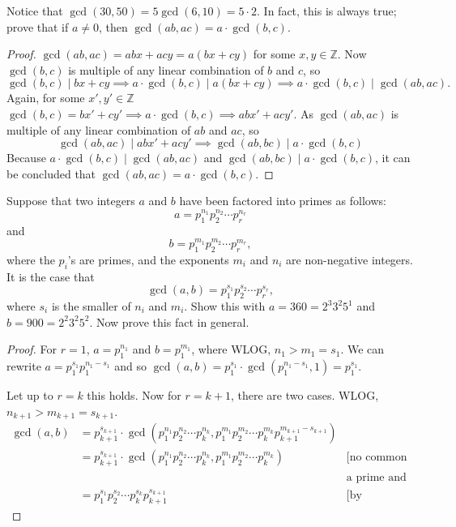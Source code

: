 \documentclass[12pt]{article}
\newenvironment{exercise}[2][Exercise]{\begin{trivlist}
\item[\hskip \labelsep {\bfseries #1}\hskip \labelsep {\bfseries #2.}]}{\end{trivlist}}
\begin{document}
\begin{exercise}{9}
    Notice that \(\gcd(30, 50) = 5 \gcd(6, 10) = 5 \cdot 2\). In fact, this is always true; prove that if \(a \neq 0\), then \(\gcd(ab, ac) = a \cdot \gcd(b, c)\).
\end{exercise}

\begin{proof}
    $\gcd(ab,ac)= abx+acy = a(bx+cy)$ for some $x, y\in \mathbb{Z}$. Now $\gcd(b,c)$ is multiple of any linear combination of $b$ and $c$, so
    $$
    \gcd(b,c) \mid bx + cy \implies a\cdot \gcd(b,c) \mid a(bx+cy) \implies a\cdot \gcd(b,c) \mid \gcd(ab,ac).
    $$
    Again, for some $x', y' \in \mathbb{Z}$  $\gcd(b,c) = bx'+cy' \implies a \cdot \gcd(b,c) \implies abx'+acy'$. As $\gcd(ab,ac)$ is multiple of any linear combination of $ab$ and $ac$, so
    \[
    \gcd(ab,ac) \mid abx'+acy' \implies \gcd(ab,bc) \mid a\cdot \gcd(b,c)
    \]
    Because $a\cdot \gcd(b,c) \mid \gcd(ab,ac)$ and $\gcd(ab,bc) \mid a\cdot \gcd(b,c)$, it can be concluded that $\gcd(ab,ac)=a\cdot \gcd(b,c)$.
\end{proof}

\begin{exercise}{10}
Suppose that two integers \(a\) and \(b\) have been factored into primes as follows:
\[
a = p_1^{n_1} p_2^{n_2} \cdots p_r^{n_r}
\]
and
\[
b = p_1^{m_1} p_2^{m_2} \cdots p_r^{m_r},
\]
where the \(p_i\)'s are primes, and the exponents \(m_i\) and \(n_i\) are non-negative integers. It is the case that
\[
\gcd(a, b) = p_1^{s_1} p_2^{s_2} \cdots p_r^{s_r},
\]
where \(s_i\) is the smaller of \(n_i\) and \(m_i\). Show this with \(a = 360 = 2^3 3^2 5^1\) and \(b = 900 = 2^2 3^2 5^2\). Now prove this fact in general.
\end{exercise}

\begin{proof}
For $r=1$, $a=p_1^{n_1}$ and $b=p_1^{m_1}$, where WLOG, $n_1 > m_1=s_1$. We can rewrite $a=p_1^{s_1}p_1^{n_1-s_1}$ and so $\gcd(a,b)=p_1^{s_1}\cdot \gcd(p_1^{n_1-s_1}, 1)=p_1^{s_1}$.

Let up to $r=k$ this holds. Now for $r=k+1$, there are two cases. WLOG, $n_{k+1}>m_{k+1}=s_{k+1}$.
\begin{align*}
    \gcd(a,b) & = p_{k+1}^{s_{k+1}} \cdot \gcd(p_1^{n_1} p_2^{n_2} \cdots p_k^{n_k},
    p_1^{m_1} p_2^{m_2} \cdots p_k^{m_k} p_{k+1}^{m_{k+1}-s_{k+1}}) & \\
    & = p_{k+1}^{s_{k+1}} \cdot \gcd(p_1^{n_1} p_2^{n_2} \cdots p_k^{n_k},    p_1^{m_1} p_2^{m_2} \cdots p_k^{m_k}) & \text{[no common divisor exists between } \\
    & &\text{a prime and other primes.]} \\
    & = p_1^{s_1} p_2^{s_2} \cdots p_k^{s_k} p_{k+1}^{s_{k+1}} & \text{[by induction hypothesis.]}
\end{align*}
\end{proof}
\end{document}
